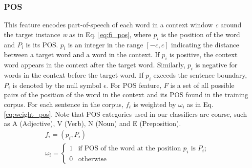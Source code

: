 \documentclass[english]{jnlp_1.4}
\begin{document}
\subsubsection{POS}
This feature encodes part-of-speech of each word in a context window \textit{c} around the target instance \textit{w} as in Eq. \eqref{eq:fi_pos}, 
where $p_{i}$ is the position of the word and $P_{i}$ is its POS. $p_{i}$ is an integer in the range $[-c,c]$ indicating the distance between a target word and a word in the context. 
If $p_{i}$ is positive, the context word appears in the context after the target word. 
Similarly, $p_{i}$ is negative for words in the context before the target word. 
If $p_{i}$ exceeds the sentence boundary,
$P_{i}$ is denoted by the null symbol $\epsilon$. 
For POS feature, $F$ is a set of all possible pairs of the position of the word in the context and its POS found in the training corpus. For each sentence in the corpus, 
$f_i$ is weighted by $\omega_i$ as in Eq. \eqref{eq:weight_pos}. 
Note that POS categories used in our classifiers are coarse, 
such as A (Adjective), V (Verb), N (Noun) and E (Preposition).
\begin{gather}
\label{eq:fi_pos}
f_{i}=(p_{i},P_{i})  \\
\label{eq:weight_pos}
 \omega_{i} = \left \{ \begin{array}{ll} 1 & \mbox{if POS of the word at the position $p_{i}$ is $P_{i}$;}\\ 0 & \mbox{otherwise} \end{array} \right.
\end{gather}
\end{document}
